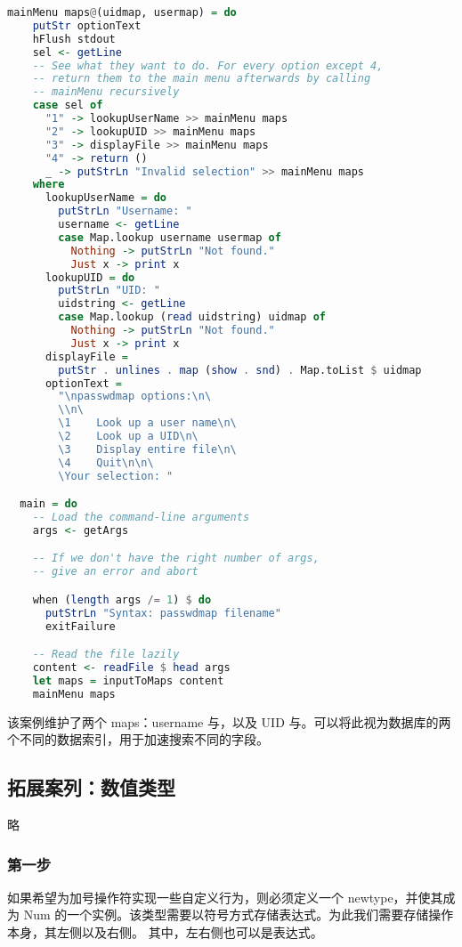 \documentclass[./main.tex]{subfiles}
\begin{document}
\begin{lstlisting}[language=Haskell]
  mainMenu maps@(uidmap, usermap) = do
    putStr optionText
    hFlush stdout
    sel <- getLine
    -- See what they want to do. For every option except 4,
    -- return them to the main menu afterwards by calling
    -- mainMenu recursively
    case sel of
      "1" -> lookupUserName >> mainMenu maps
      "2" -> lookupUID >> mainMenu maps
      "3" -> displayFile >> mainMenu maps
      "4" -> return ()
      _ -> putStrLn "Invalid selection" >> mainMenu maps
    where
      lookupUserName = do
        putStrLn "Username: "
        username <- getLine
        case Map.lookup username usermap of
          Nothing -> putStrLn "Not found."
          Just x -> print x
      lookupUID = do
        putStrLn "UID: "
        uidstring <- getLine
        case Map.lookup (read uidstring) uidmap of
          Nothing -> putStrLn "Not found."
          Just x -> print x
      displayFile =
        putStr . unlines . map (show . snd) . Map.toList $ uidmap
      optionText =
        "\npasswdmap options:\n\
        \\n\
        \1    Look up a user name\n\
        \2    Look up a UID\n\
        \3    Display entire file\n\
        \4    Quit\n\n\
        \Your selection: "

  main = do
    -- Load the command-line arguments
    args <- getArgs

    -- If we don't have the right number of args,
    -- give an error and abort

    when (length args /= 1) $ do
      putStrLn "Syntax: passwdmap filename"
      exitFailure

    -- Read the file lazily
    content <- readFile $ head args
    let maps = inputToMaps content
    mainMenu maps
\end{lstlisting}

该案例维护了两个 maps：username 与，以及 UID 与。可以将此视为数据库的两个不同的数据索引，用于加速搜索不同的字段。

\subsection*{拓展案列：数值类型}

略

\subsubsection*{第一步}

如果希望为加号操作符实现一些自定义行为，则必须定义一个 newtype，并使其成为 Num 的一个实例。该类型需要以符号方式存储表达式。为此我们需要存储操作本身，其左侧以及右侧。
其中，左右侧也可以是表达式。
\end{document}
